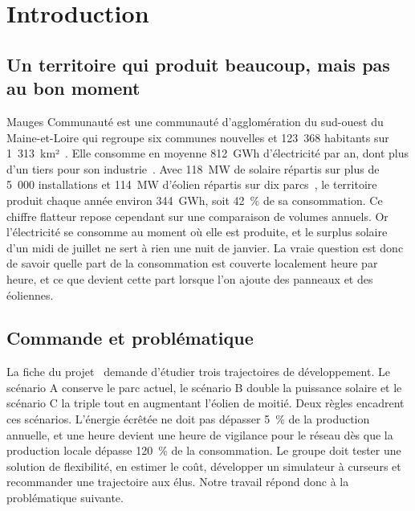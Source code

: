 \chapter*{Introduction}
\label{chap:intro}

\section*{Un territoire qui produit beaucoup, mais pas au bon moment}

Mauges Communauté est une communauté d'agglomération du sud-ouest du Maine-et-Loire qui regroupe six communes nouvelles et 123~368 habitants sur 1~313~km²~\cite{insee_dossier}. Elle consomme en moyenne 812~GWh d'électricité par an, dont plus d'un tiers pour son industrie~\cite{odre_conso}. Avec 118~MW de solaire répartis sur plus de 5~000 installations et 114~MW d'éolien répartis sur dix parcs~\cite{odre_registre}, le territoire produit chaque année environ 344~GWh, soit 42~\% de sa consommation. Ce chiffre flatteur repose cependant sur une comparaison de volumes annuels. Or l'électricité se consomme au moment où elle est produite, et le surplus solaire d'un midi de juillet ne sert à rien une nuit de janvier. La vraie question est donc de savoir quelle part de la consommation est couverte localement heure par heure, et ce que devient cette part lorsque l'on ajoute des panneaux et des éoliennes.

\section*{Commande et problématique}

La fiche du projet~\cite{fiche_projets} demande d'étudier trois trajectoires de développement. Le scénario A conserve le parc actuel, le scénario B double la puissance solaire et le scénario C la triple tout en augmentant l'éolien de moitié. Deux règles encadrent ces scénarios. L'énergie écrêtée ne doit pas dépasser 5~\% de la production annuelle, et une heure devient une heure de vigilance pour le réseau dès que la production locale dépasse 120~\% de la consommation. Le groupe doit tester une solution de flexibilité, en estimer le coût, développer un simulateur à curseurs et recommander une trajectoire aux élus. Notre travail répond donc à la problématique suivante.

